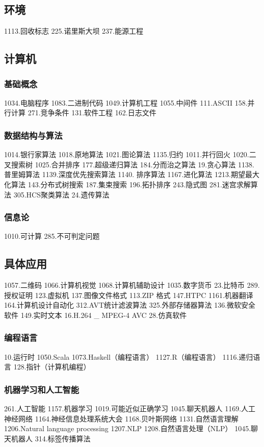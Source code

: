 \subsection{环境}
1113.回收标志
225.诺里斯大坝
237.能源工程

\subsection{计算机}
\subsubsection{基础概念}
1034.电脑程序
1083.二进制代码
1049.计算机工程
1055.中间件
111.ASCII
158.并行计算
271.竞争条件
131.软件工程
162.日志文件
\subsubsection{数据结构与算法}
1014.银行家算法
1018.原地算法
1021.图论算法
1135.归约
1011.并行回火
1020.二叉搜索树
1025.合并排序
177.超级递归算法
184.分而治之算法
19.贪心算法
1138.普里姆算法
1139.深度优先搜索算法
1140. 排序算法
1167.进化算法
1213.期望最大化算法
143.分布式树搜索
187.集束搜索
196.拓扑排序
243.隐式图
281.迷宫求解算法
305.HCS聚类算法
24.遗传算法
\subsubsection{信息论}
1010.可计算
285.不可判定问题
\subsection{具体应用}
1057.二维码
1066.计算机视觉
1068.计算机辅助设计
1035.数字货币
23.比特币
289.授权证明
123.虚拟机
137.图像文件格式
113.ZIP 格式
147.HTPC
1161.机器翻译
164.计算机设计自动化
312.AVT统计滤波算法
325.外部存储器算法
136.微软安全软件
149.实时文本
16.H.264 _ MPEG-4 AVC
28.仿真软件
\subsubsection{编程语言}
10.运行时
1050.Scala
1073.Haskell（编程语言）
1127.R（编程语言）
1116.递归语言
128.指针（计算机编程）
\subsubsection{机器学习和人工智能}
261.人工智能
1157.机器学习
1019.可能近似正确学习
1045.聊天机器人
1169.人工神经网络
1164.神经信息处理系统大会
1168.贝叶斯网络
1131.自然语言理解
1206.Natural language processing
1207.NLP
1208.自然语言处理（NLP）
1045.聊天机器人
314.标签传播算法
